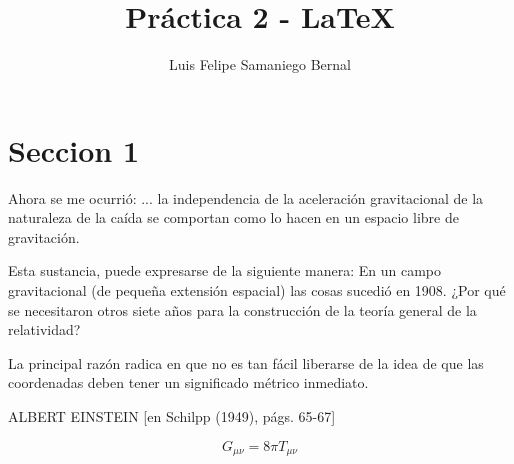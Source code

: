 \documentclass[a4paper,10pt]{article}
\title{Práctica 2 - \LaTeX } %
\author{Luis Felipe Samaniego Bernal} %
\begin{document}
\maketitle

% 

\section{Seccion 1}


Ahora se me ocurrió: ... la independencia de la aceleración gravitacional de la naturaleza de la caída se comportan como lo hacen en un espacio libre de gravitación. 


Esta sustancia, puede expresarse de la siguiente manera: En un campo gravitacional (de pequeña extensión espacial) las cosas sucedió en 1908. ¿Por qué se necesitaron otros siete años para la construcción de la teoría general de la relatividad?


La principal razón radica en que no es tan fácil liberarse de la idea de que las coordenadas deben tener un significado métrico inmediato.
\begin{flushright}
ALBERT EINSTEIN [en Schilpp (1949), págs. 65-67]
\end{flushright}

\[ G_{\mu\nu} = 8 \pi T_{\mu\nu} \]
\end{document}
